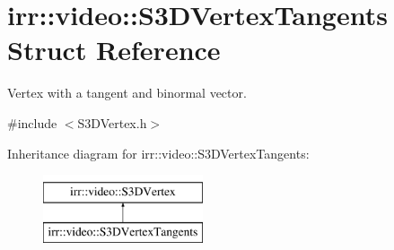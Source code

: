 \hypertarget{structirr_1_1video_1_1S3DVertexTangents}{}\section{irr\+:\+:video\+:\+:S3\+D\+Vertex\+Tangents Struct Reference}
\label{structirr_1_1video_1_1S3DVertexTangents}


Vertex with a tangent and binormal vector.  




{\ttfamily \#include $<$S3\+D\+Vertex.\+h$>$}

Inheritance diagram for irr\+:\+:video\+:\+:S3\+D\+Vertex\+Tangents\+:\begin{figure}[H]
\begin{center}
\leavevmode
\includegraphics[height=2.000000cm]{structirr_1_1video_1_1S3DVertexTangents}
\end{center}
\end{figure}
